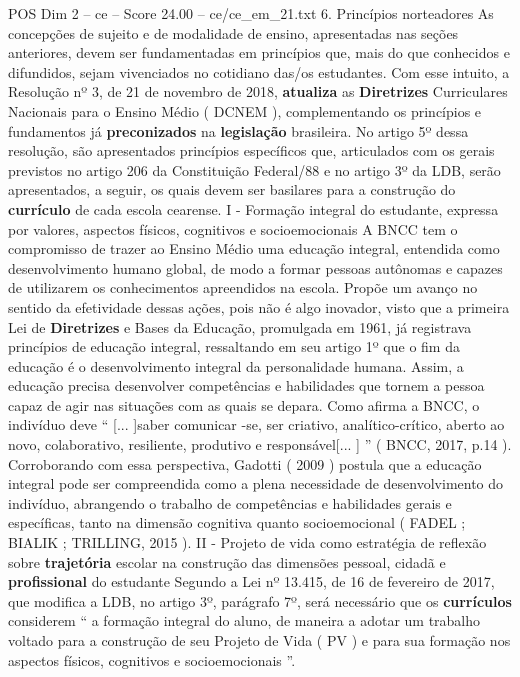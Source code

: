 \begin{textsample}{POS Dim 2 – ce – Score 24.00 – ce/ce\_em\_21.txt}  \label{ex:f2_pos_090}
6.
Princípios norteadores As concepções de sujeito e de modalidade de ensino, apresentadas nas seções anteriores, devem ser fundamentadas em princípios que, mais do que conhecidos e difundidos, sejam vivenciados no cotidiano das/os estudantes.
Com esse intuito, a Resolução nº 3, de 21 de novembro de 2018, \textbf{atualiza} as \textbf{Diretrizes} Curriculares Nacionais para o Ensino Médio ( DCNEM ), complementando os princípios e fundamentos já \textbf{preconizados} na \textbf{legislação} brasileira.
No artigo 5º dessa resolução, são apresentados princípios específicos que, articulados com os gerais previstos no artigo 206 da Constituição Federal/88 e no artigo 3º da LDB, serão apresentados, a seguir, os quais devem ser basilares para a construção do \textbf{currículo} de cada escola cearense.
I - Formação integral do estudante, expressa por valores, aspectos físicos, cognitivos e socioemocionais A BNCC tem o compromisso de trazer ao Ensino Médio uma educação integral, entendida como desenvolvimento humano global, de modo a formar pessoas autônomas e capazes de utilizarem os conhecimentos apreendidos na escola.
Propõe um avanço no sentido da efetividade dessas ações, pois não é algo inovador, visto que a primeira Lei de \textbf{Diretrizes} e Bases da Educação, promulgada em 1961, já registrava princípios de educação integral, ressaltando em seu artigo 1º que o fim da educação é o desenvolvimento integral da personalidade humana.
Assim, a educação precisa desenvolver competências e habilidades que tornem a pessoa capaz de agir nas situações com as quais se depara.
Como afirma a BNCC, o indivíduo deve “ [... ]saber comunicar -se, ser criativo, analítico-crítico, aberto ao novo, colaborativo, resiliente, produtivo e responsável[... ] ” ( BNCC, 2017, p.14 ).
Corroborando com essa perspectiva, Gadotti ( 2009 ) postula que a educação integral pode ser compreendida como a plena necessidade de desenvolvimento do indivíduo, abrangendo o trabalho de competências e habilidades gerais e específicas, tanto na dimensão cognitiva quanto socioemocional ( FADEL ; BIALIK ; TRILLING, 2015 ).
II - Projeto de vida como estratégia de reflexão sobre \textbf{trajetória} escolar na construção das dimensões pessoal, cidadã e \textbf{profissional} do estudante Segundo a Lei nº 13.415, de 16 de fevereiro de 2017, que modifica a LDB, no artigo 3º, parágrafo 7º, será necessário que os \textbf{currículos} considerem “ a formação integral do aluno, de maneira a adotar um trabalho voltado para a construção de seu Projeto de Vida ( PV ) e para sua formação nos aspectos físicos, cognitivos e socioemocionais ”.

\end{textsample}
